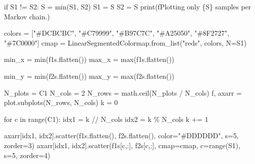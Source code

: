 \documentclass[
  letterpaper,
  DIV=11,
  numbers=noendperiod]{scrartcl}
\newenvironment{Shaded}{\begin{snugshade}}{\end{snugshade}}
\newcommand{\BuiltInTok}[1]{\textcolor[rgb]{0.00,0.23,0.31}{#1}}
\newcommand{\ControlFlowTok}[1]{\textcolor[rgb]{0.00,0.23,0.31}{#1}}
\newcommand{\DecValTok}[1]{\textcolor[rgb]{0.68,0.00,0.00}{#1}}
\newcommand{\KeywordTok}[1]{\textcolor[rgb]{0.00,0.23,0.31}{#1}}
\newcommand{\NormalTok}[1]{\textcolor[rgb]{0.00,0.23,0.31}{#1}}
\newcommand{\OperatorTok}[1]{\textcolor[rgb]{0.37,0.37,0.37}{#1}}
\newcommand{\SpecialCharTok}[1]{\textcolor[rgb]{0.37,0.37,0.37}{#1}}
\newcommand{\SpecialStringTok}[1]{\textcolor[rgb]{0.13,0.47,0.30}{#1}}
\newcommand{\StringTok}[1]{\textcolor[rgb]{0.13,0.47,0.30}{#1}}
\begin{document}
\begin{Shaded}
\begin{Highlighting}[]
  \ControlFlowTok{if}\NormalTok{ S1 }\OperatorTok{!=}\NormalTok{ S2:}
\NormalTok{    S }\OperatorTok{=} \BuiltInTok{min}\NormalTok{(S1, S2)}
\NormalTok{    S1 }\OperatorTok{=}\NormalTok{ S}
\NormalTok{    S2 }\OperatorTok{=}\NormalTok{ S}
    \BuiltInTok{print}\NormalTok{(}\SpecialStringTok{f\textquotesingle{}Plotting only }\SpecialCharTok{\{}\NormalTok{S}\SpecialCharTok{\}}\SpecialStringTok{ samples per Markov chain.\textquotesingle{}}\NormalTok{)}
  
\NormalTok{  colors }\OperatorTok{=}\NormalTok{ [}\StringTok{"\#DCBCBC"}\NormalTok{, }\StringTok{"\#C79999"}\NormalTok{, }\StringTok{"\#B97C7C"}\NormalTok{,}
            \StringTok{"\#A25050"}\NormalTok{, }\StringTok{"\#8F2727"}\NormalTok{, }\StringTok{"\#7C0000"}\NormalTok{]}
\NormalTok{  cmap }\OperatorTok{=}\NormalTok{ LinearSegmentedColormap.from\_list(}\StringTok{"reds"}\NormalTok{, colors, N}\OperatorTok{=}\NormalTok{S1)}

\NormalTok{  min\_x }\OperatorTok{=} \BuiltInTok{min}\NormalTok{(f1s.flatten())}
\NormalTok{  max\_x }\OperatorTok{=} \BuiltInTok{max}\NormalTok{(f1s.flatten())}
  
\NormalTok{  min\_y }\OperatorTok{=} \BuiltInTok{min}\NormalTok{(f2s.flatten())}
\NormalTok{  max\_y }\OperatorTok{=} \BuiltInTok{max}\NormalTok{(f2s.flatten())}
  
\NormalTok{  N\_plots }\OperatorTok{=}\NormalTok{ C1}
\NormalTok{  N\_cols }\OperatorTok{=} \DecValTok{2}
\NormalTok{  N\_rows }\OperatorTok{=}\NormalTok{ math.ceil(N\_plots }\OperatorTok{/}\NormalTok{ N\_cols)}
\NormalTok{  f, axarr }\OperatorTok{=}\NormalTok{ plot.subplots(N\_rows, N\_cols)}
\NormalTok{  k }\OperatorTok{=} \DecValTok{0}
  
  \ControlFlowTok{for}\NormalTok{ c }\KeywordTok{in} \BuiltInTok{range}\NormalTok{(C1):}
\NormalTok{    idx1 }\OperatorTok{=}\NormalTok{ k }\OperatorTok{//}\NormalTok{ N\_cols}
\NormalTok{    idx2 }\OperatorTok{=}\NormalTok{ k }\OperatorTok{\%}\NormalTok{ N\_cols}
\NormalTok{    k }\OperatorTok{+=} \DecValTok{1}
    
\NormalTok{    axarr[idx1, idx2].scatter(f1s.flatten(), f2s.flatten(),}
\NormalTok{                              color}\OperatorTok{=}\StringTok{"\#DDDDDD"}\NormalTok{, s}\OperatorTok{=}\DecValTok{5}\NormalTok{, zorder}\OperatorTok{=}\DecValTok{3}\NormalTok{)}
\NormalTok{    axarr[idx1, idx2].scatter(f1s[c,:], f2s[c,:],}
\NormalTok{                              cmap}\OperatorTok{=}\NormalTok{cmap, c}\OperatorTok{=}\BuiltInTok{range}\NormalTok{(S1), s}\OperatorTok{=}\DecValTok{5}\NormalTok{, zorder}\OperatorTok{=}\DecValTok{4}\NormalTok{)}
    

\end{Highlighting}
\end{Shaded}
\end{document}
